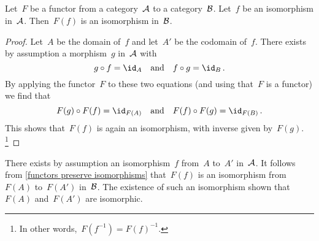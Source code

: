 \subsection{}

\begin{proposition}
	\label{functors preserve isomorphisms}
	Let~$F$ be a functor from a category~$\mathcal{A}$ to a category~$\mathcal{B}$.
	Let~$f$ be an isomorphism in~$\mathcal{A}$.
	Then~$F(f)$ is an isomorphism in~$\mathcal{B}$.
\end{proposition}

\begin{proof}
	Let~$A$ be the domain of~$f$ and let~$A'$ be the codomain of~$f$.
	There exists by assumption a morphism~$g$ in~$\mathcal{A}$ with
	\[
		g \circ f
		=
		\id_A
		\quad\text{and}\quad
		f \circ g
		=
		\id_B \,.
	\]
	By applying the functor~$F$ to these two equations (and using that~$F$ is a functor) we find that
	\[
		F(g) \circ F(f)
		=
		\id_{F(A)}
		\quad\text{and}\quad
		F(f) \circ F(g)
		=
		\id_{F(B)} \,.
	\]
	This shows that~$F(f)$ is again an isomorphism, with inverse given by~$F(g)$.%
	\footnote{
		In other words,~$F(f^{-1}) = F(f)^{-1}$.
	}
\end{proof}

There exists by assumption an isomorphism~$f$ from~$A$ to~$A'$ in~$\mathcal{A}$.
It follows from \cref{functors preserve isomorphisms} that~$F(f)$ is an isomorphism from~$F(A)$ to~$F(A')$ in~$\mathcal{B}$.
The existence of such an isomorphism shown that~$F(A)$ and~$F(A')$ are isomorphic.

